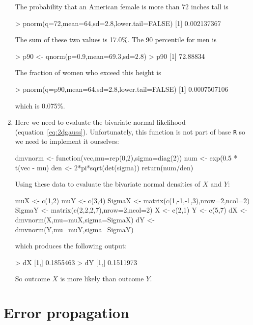 \begin{enumerate}
The probability that an American female is more than 72 inches tall is

\begin{console}
> pnorm(q=72,mean=64,sd=2.8,lower.tail=FALSE)
[1] 0.002137367
\end{console}

The sum of these two values is 17.0\%. The 90 percentile for men is

\begin{console}
> p90 <- qnorm(p=0.9,mean=69.3,sd=2.8)
> p90
[1] 72.88834
\end{console}

The fraction of women who exceed this height is

\begin{console}
> pnorm(q=p90,mean=64,sd=2.8,lower.tail=FALSE)
[1] 0.0007507106
\end{console}

\noindent which is 0.075\%.

\item Here we need to evaluate the bivariate normal likelihood
  (equation~\ref{eq:2dgauss}). Unfortunately, this function is not
  part of base \texttt{R} so we need to implement it ourselves:

\begin{script}
dmvnorm <- function(vec,mu=rep(0,2),sigma=diag(2)){
  num <- exp(0.5 * t(vec - mu) %
  den <- 2*pi*sqrt(det(sigma))
  return(num/den)
}
\end{script}

Using these data to evaluate the bivariate normal densities of $X$ and
$Y$:

\begin{script}[firstnumber=6]
muX <- c(1,2)
muY <- c(3,4)
SigmaX <- matrix(c(1,-1,-1,3),nrow=2,ncol=2)
SigmaY <- matrix(c(2,2,2,7),nrow=2,ncol=2)
X <- c(2,1)
Y <- c(5,7)
dX <- dmvnorm(X,mu=muX,sigma=SigmaX)
dY <- dmvnorm(Y,mu=muY,sigma=SigmaY)
\end{script}

\noindent which produces the following output:

\begin{console}
> dX
[1,] 0.1855463
> dY
[1,] 0.1511973
\end{console}

So outcome $X$ is more likely than outcome $Y$. 

\end{enumerate}

\section{Error propagation}
\label{sec:sol-errorprop}

